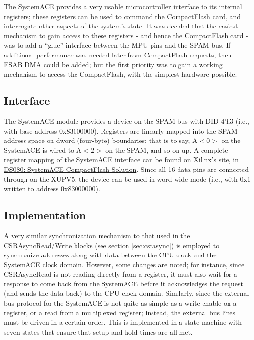 \documentclass[10pt]{report}
\begin{document}
The SystemACE provides a very usable microcontroller interface to its
internal registers; these registers can be used to command the CompactFlash
card, and interrogate other aspects of the system's state. It was decided
that the easiest mechanism to gain access to these registers - and hence the
CompactFlash card - was to add a ``glue'' interface between the MPU pins and
the SPAM bus. If additional performance was needed later from CompactFlash
requests, then FSAB DMA could be added; but the first priority was to gain a
working mechanism to access the CompactFlash, with the simplest hardware
possible.

\subsection{Interface}

The SystemACE module provides a device on the SPAM bus with DID 4'h3 (i.e.,
with base address 0x83000000). Registers are linearly mapped into the SPAM
address space on dword (four-byte) boundaries; that is to say, A$<0>$ on the
SystemACE is wired to A$<2>$ on the SPAM, and so on up. A complete register
mapping of the SystemACE interface can be found on Xilinx's site, in
\href{http://www.xilinx.com/support/documentation/data_sheets/ds080.pdf}{DS080:
SystemACE CompactFlash Solution}. Since all 16 data pins are connected
through on the XUPV5, the device can be used in word-wide mode (i.e., with
0x1 written to address 0x83000000).

\subsection{Implementation}

A very similar synchronization mechanism to that used in the
CSRAsyncRead/Write blocks (see section \ref{sec:csrasync}) is employed to
synchronize addresses along with data between the CPU clock and the
SystemACE clock domain.  However, some changes are noted; for instance,
since CSRAsyncRead is not reading directly from a register, it must also
wait for a response to come back from the SystemACE before it acknowledges
the request (and sends the data back) to the CPU clock domain.  Similarly,
since the external bus protocol for the SystemACE is not quite as simple as
a write enable on a register, or a read from a multiplexed register;
instead, the external bus lines must be driven in a certain order.  This is
implemented in a state machine with seven states that ensure that setup and
hold times are all met.
\end{document}
